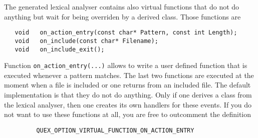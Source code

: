 The generated lexical analyser contains also virtual functions that do not do
anything but wait for being overriden by a derived class. Those functions are

\begin{lstlisting}
   void   on_action_entry(const char* Pattern, const int Length); 
   void   on_include(const char* Filename);
   void   on_include_exit();
\end{lstlisting}

Function {\tt on\_action\_entry(...)} allows to write a user defined function
that is executed whenever a pattern matches. The last two functions are
executed at the moment when a file is included or one returns from an included 
file. The default implementation is that they do not do anything. Only if one
derives a class from the lexical analyser, then one creates its own 
handlers for these events. If you do not want to use these functions 
at all, you are free to outcomment the definition 

\begin{lstlisting}
         QUEX_OPTION_VIRTUAL_FUNCTION_ON_ACTION_ENTRY
\end{lstlisting}

